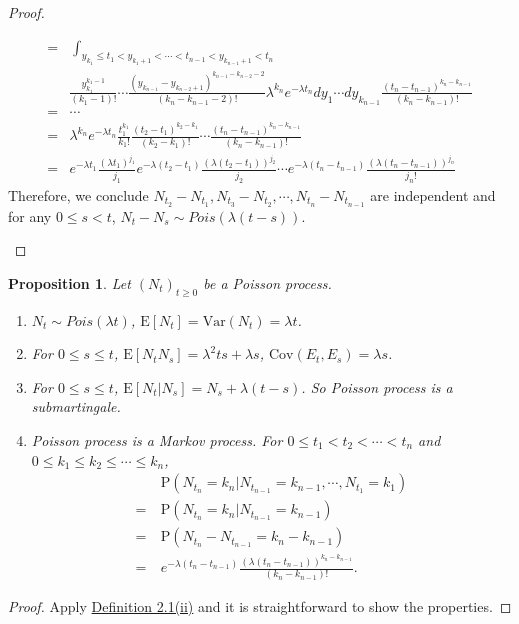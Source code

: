 \documentclass{article}
\newtheorem{proposition}{Proposition}[section]
\theoremstyle{nonumberplain}
\newtheorem{proof}{Proof.}
\begin{document}
\begin{proof}
\begin{itemize}
\begin{align*}
	=&\ \int_{y_{k_1}\le t_1<y_{k_1+1}<\cdots<t_{n-1}<y_{k_{n-1}+1}<t_n}\\
	&\frac{y_{k_1}^{k_1-1}}{(k_1-1)!}\cdots\frac{(y_{k_{n-1}}-y_{k_{n-2}+1})^{k_{n-1}-k_{n-2}-2}}{(k_n-k_{n-1}-2)!}\lambda^{k_n}e^{-\lambda t_n}dy_1\cdots dy_{k_{n-1}}\frac{(t_{n}-t_{n-1})^{k_n-k_{n-1}}}{(k_n-k_{n-1})!}\\
	=&\cdots\\
	=&\lambda^{k_n}e^{-\lambda t_n}\frac{t_{1}^{k_1}}{k_1!}\frac{(t_{2}-t_{1})^{k_2-k_{1}}}{(k_2-k_{1})!}\cdots\frac{(t_{n}-t_{n-1})^{k_n-k_{n-1}}}{(k_n-k_{n-1})!}\\
	=&e^{-\lambda t_1}\frac{(\lambda t_1)^{j_1}}{j_1}e^{-\lambda(t_2- t_1)}\frac{(\lambda (t_2-t_1))^{j_2}}{j_2}\cdots e^{-\lambda(t_n-t_{n-1}) }\frac{(\lambda(t_{n}-t_{n-1}))^{j_n}}{j_n!}
\end{align*}
	Therefore, we conclude $N_{t_2}-N_{t_1},N_{t_3}-N_{t_2},\cdots,N_{t_n}-N_{t_{n-1}}$ are independent and for any $0\le s < t$, $N_t-N_s\sim Pois(\lambda(t-s))$.
\end{itemize}
\end{proof}

\begin{proposition}
	Let $(N_t)_{t\ge0}$ be a Poisson process.
	\begin{enumerate}
		\item $N_t\sim Pois(\lambda t)$, $\mathrm{E}[N_t]=\mathrm{Var}(N_t)=\lambda t$.
		\item For $0\le s\le t$, $\mathrm{E}[N_tN_s]=\lambda^2ts+\lambda s$, $\mathrm{Cov}(E_t,E_s)=\lambda s$.
		\item For $0\le s\le t$, $\mathrm{E}[N_t|N_s]=N_s+\lambda(t-s)$. So Poisson process is a submartingale.
		\item Poisson process is a Markov process. For $0\le t_1< t_2<\cdots<t_n$ and $0\le k_1\le k_2\le\cdots\le k_n$,
		\begin{align*} &\mathrm{P}(N_{t_n}=k_n|N_{t_{n-1}}=k_{n-1},\cdots,N_{t_1}=k_1)\\
		=\ &\mathrm{P}(N_{t_n}=k_n|N_{t_{n-1}}=k_{n-1})\\
		=\ &\mathrm{P}(N_{t_n}-N_{t_{n-1}}=k_n-k_{n-1})\\
		=\ &e^{-\lambda(t_n-t_{n-1}) }\frac{(\lambda(t_{n}-t_{n-1}))^{k_n-k_{n-1}}}{(k_n-k_{n-1})!}. 
		\end{align*}
	\end{enumerate}
\end{proposition}
\begin{proof}
	Apply \hyperlink{Definition 2.1(ii)}{Definition 2.1(ii)} and it is straightforward to show the properties.
\end{proof}
\end{document}
